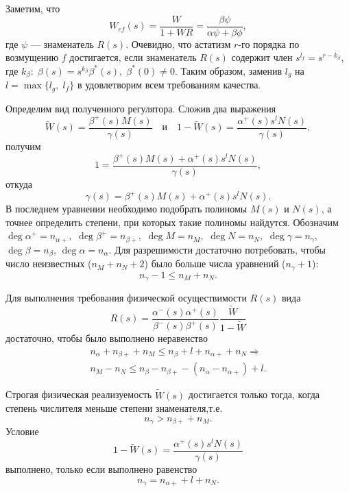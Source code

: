 \documentclass[../../TAU.tex]{subfiles}
\begin{document}
    Заметим, что
    $$
        W_{ef}(s) = \frac{W}{1+WR} = \frac{\beta\psi}{\alpha\psi+\beta\phi},
    $$
    где $\psi$ --- знаменатель $R(s)$. Очевидно, что астатизм $r$-го порядка по возмущению $f$ достигается, если знаменатель $R(s)$ содержит член $s^{l_f}=s^{r-k_\beta}$, где $k_\beta:\; \beta(s) = s^{k_\beta}\beta^*(s),\; \beta^*(0)\neq0$. Таким образом, заменив $l_g$ на $l=\max\{l_g,\;l_f\}$ в  удовлетворим всем требованиям качества.

    Определим вид полученного регулятора. Сложив два выражения
    $$
        \tilde W(s) = \frac{\beta^+(s)M(s)}{\gamma(s)}\quad \text{и}\quad 1-\tilde W(s) = \frac{\alpha^+(s)s^lN(s)}{\gamma(s)},
    $$
    получим
    $$
        1 = \frac{\beta^+(s)M(s)+\alpha^+(s)s^lN(s)}{\gamma(s)},
    $$
    откуда
    \begin{equation}\label{EQ2}
        \gamma(s) = \beta^+(s)M(s)+\alpha^+(s)s^lN(s).
    \end{equation}
    В последнем уравнении необходимо подобрать полиномы $M(s)$ и $N(s)$, а точнее определить степени, при которых такие полиномы найдутся.
    Обозначим 
        ${\deg\alpha^+ = n_{\alpha+},}$
        $\deg\beta^+ = n_{\beta+},$
        $\deg M = n_M,$
        $\deg N = n_N,$
        $\deg\gamma = n_\gamma$,
        $\deg\beta=n_{\beta}$,
        $\deg\alpha=n_{\alpha}$. 
        Для разрешимости  достаточно потребовать, чтобы число неизвестных ($n_M+n_N+2$) было больше числа уравнений ($n_\gamma+1$):
    $$
        \boxed{n_\gamma-1 \le n_M+n_N}.
    $$

    Для выполнения требования физической осуществимости $R(s)$ вида
    $$
        R(s) = \frac{\alpha^-(s)\alpha^+(s)}{\beta^-(s)\beta^+(s)}\frac{\tilde W}{1-\tilde W}
    $$
    достаточно, чтобы было выполнено неравенство
    $$
        \begin{aligned}
            n_{\alpha}+n_{\beta+}+n_M \le n_{\beta}+l+n_{\alpha+}+n_N\Longrightarrow\\
            \boxed{n_M-n_N \le n_{\beta}-n_{\beta+}-(n_{\alpha}-n_{\alpha+}) + l}.
        \end{aligned}
    $$

    Строгая физическая реализуемость $\tilde W(s)$ достигается только тогда, когда степень числителя меньше степени знаменателя,т.е.
    $$
        \boxed{n_\gamma > n_{\beta+}+n_M}.
    $$
    Условие
    $$
        1-\tilde W(s) = \frac{\alpha^+(s)s^lN(s)}{\gamma(s)}
    $$
    выполнено, только если выполнено равенство
    $$
        \boxed{n_\gamma = n_{\alpha+}+l+n_N}.
    $$

\end{document}
